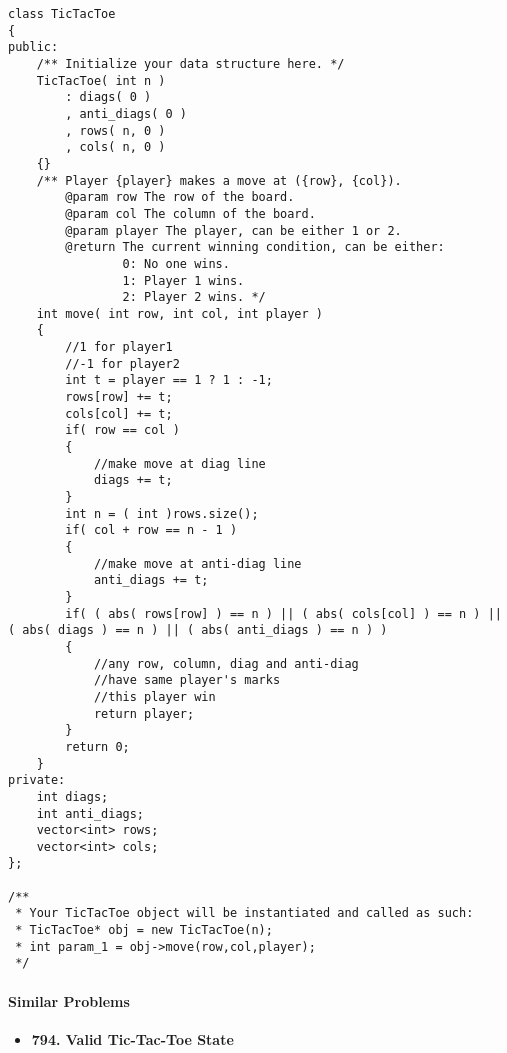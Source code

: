 \setcounter{lstlisting}{0}
\begin{lstlisting}[style=customc, caption={One Dimension Array}]
class TicTacToe
{
public:
    /** Initialize your data structure here. */
    TicTacToe( int n )
        : diags( 0 )
        , anti_diags( 0 )
        , rows( n, 0 )
        , cols( n, 0 )
    {}
    /** Player {player} makes a move at ({row}, {col}).
        @param row The row of the board.
        @param col The column of the board.
        @param player The player, can be either 1 or 2.
        @return The current winning condition, can be either:
                0: No one wins.
                1: Player 1 wins.
                2: Player 2 wins. */
    int move( int row, int col, int player )
    {
        //1 for player1
        //-1 for player2
        int t = player == 1 ? 1 : -1;
        rows[row] += t;
        cols[col] += t;
        if( row == col )
        {
            //make move at diag line
            diags += t;
        }
        int n = ( int )rows.size();
        if( col + row == n - 1 )
        {
            //make move at anti-diag line
            anti_diags += t;
        }
        if( ( abs( rows[row] ) == n ) || ( abs( cols[col] ) == n ) || ( abs( diags ) == n ) || ( abs( anti_diags ) == n ) )
        {
            //any row, column, diag and anti-diag
            //have same player's marks
            //this player win
            return player;
        }
        return 0;
    }
private:
    int diags;
    int anti_diags;
    vector<int> rows;
    vector<int> cols;
};

/**
 * Your TicTacToe object will be instantiated and called as such:
 * TicTacToe* obj = new TicTacToe(n);
 * int param_1 = obj->move(row,col,player);
 */
\end{lstlisting}

\paragraph{Similar Problems}
\begin{itemize}
\item \textbf{794. Valid Tic-Tac-Toe State}
\end{itemize}